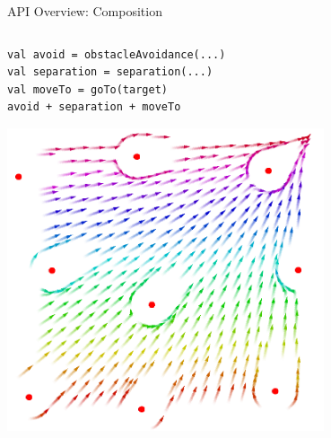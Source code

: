 \documentclass[presentation, 9pt]{beamer}\mode<presentation>{\usetheme{AMSBolognaFC}}
\begin{document}
\begin{frame}[fragile]{API Overview: Composition}
\begin{columns}
\begin{column}{0.6\textwidth}
	\begin{verbatim}
val avoid = obstacleAvoidance(...)
val separation = separation(...)
val moveTo = goTo(target)
avoid + separation + moveTo
			\end{verbatim}
\includegraphics[width=0.7\textwidth]{img/composition.png}
\end{column}

\end{columns}
\end{frame}
\end{document}
